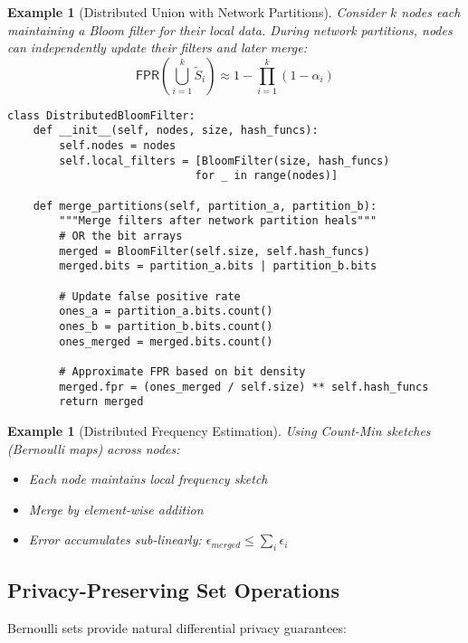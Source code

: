 \documentclass[11pt,final,hidelinks]{article}
\newtheorem{example}[theorem]{Example}
\newcommand{\obs}[1]{\widetilde{#1}}  %
\newcommand{\fprate}{\alpha}
\newcommand{\FPR}{\mathsf{FPR}}
\newcommand{\ASet}[1]{\obs{#1}}  %
\begin{document}
\begin{example}[Distributed Union with Network Partitions]
Consider $k$ nodes each maintaining a Bloom filter for their local data. During network partitions, nodes can independently update their filters and later merge:
\begin{equation}
\FPR(\bigcup_{i=1}^k \ASet{S}_i) \approx 1 - \prod_{i=1}^k (1 - \fprate_i)
\end{equation}

\begin{verbatim}
class DistributedBloomFilter:
    def __init__(self, nodes, size, hash_funcs):
        self.nodes = nodes
        self.local_filters = [BloomFilter(size, hash_funcs) 
                             for _ in range(nodes)]
    
    def merge_partitions(self, partition_a, partition_b):
        """Merge filters after network partition heals"""
        # OR the bit arrays
        merged = BloomFilter(self.size, self.hash_funcs)
        merged.bits = partition_a.bits | partition_b.bits
        
        # Update false positive rate
        ones_a = partition_a.bits.count()
        ones_b = partition_b.bits.count()
        ones_merged = merged.bits.count()
        
        # Approximate FPR based on bit density
        merged.fpr = (ones_merged / self.size) ** self.hash_funcs
        return merged
\end{verbatim}
\end{example}

\begin{example}[Distributed Frequency Estimation]
Using Count-Min sketches (Bernoulli maps) across nodes:
\begin{itemize}
    \item Each node maintains local frequency sketch
    \item Merge by element-wise addition
    \item Error accumulates sub-linearly: $\epsilon_{merged} \leq \sum_i \epsilon_i$
\end{itemize}
\end{example}

\subsection{Privacy-Preserving Set Operations}

Bernoulli sets provide natural differential privacy guarantees:
\end{document}
